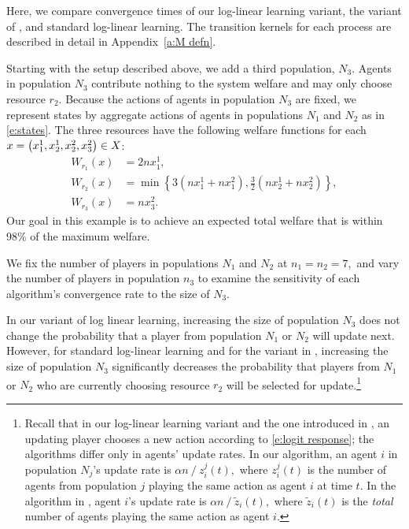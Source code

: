\begin{example}\label{e:compare to SS}

Here, we compare convergence times of our log-linear learning variant, the variant of \cite{Shah2010}, and standard log-linear learning. The transition kernels for each process are described in detail in Appendix~\ref{a:M defn}.


Starting with the setup described above,
we add a third population, $N_3$. Agents in population $N_3$ contribute nothing to the system welfare and may only choose resource $r_2.$ Because the actions of agents in population $N_3$ are fixed, we represent states by aggregate actions of agents in populations $N_1$ and $N_2$ as in \eqref{e:states}.
The three resources have the following welfare functions for each $x = \left(x_1^1,x_2^1,x_2^2,x_3^2\right)\in X$:
\begin{align*}
W_{r_1}(x) &= 2nx_1^1,\\
W_{r_2}(x) &= \min\left\{3(nx_1^1+nx_1^2),\frac{3}{2}(nx_2^1+nx_2^2)\right\},\\
W_{r_3}(x) &= nx_3^2.\label{e:ex welfare functions}
\end{align*}
Our goal in this example is to achieve an expected total welfare that is within 98\% of the maximum welfare.


We fix the number of players in populations $N_1$ and $N_2$ at $n_1 = n_2 = 7,$ and vary the number of players in population $n_3$ to examine the sensitivity of each algorithm's convergence rate to the size of $N_3$.

In our variant of log linear learning, increasing the size of population $N_3$ does not change the probability that a player from population $N_1$ or $N_2$ will update next.
However, for standard log-linear learning and for the variant in \cite{Shah2010}, increasing the size of population $N_3$ significantly decreases the probability that players from $N_1$ or $N_2$ who are currently choosing resource $r_2$ will be selected for update.\footnote{Recall that in our log-linear learning variant and the one introduced in \cite{Shah2010}, an updating player chooses a new action according to \eqref{e:logit response}; the algorithms differ only in agents' update rates. In our algorithm, an agent $i$ in population $N_j$'s update rate is $\alpha n\mathop{/}z_i^j(t),$ where $z_i^j(t)$ is the number of agents from population $j$ playing the same action as agent $i$ at time $t.$ In the algorithm in \cite{Shah2010}, agent $i$'s update rate is $\alpha n\mathop{/}\tilde{z}_i(t),$ where $\tilde{z}_i(t)$ is the {\it total} number of agents playing the same action as agent $i$.}


\end{example}
